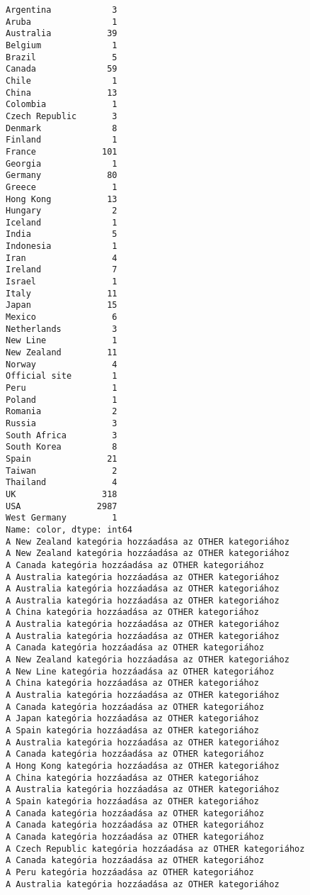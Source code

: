 \documentclass[11pt]{article}
\begin{document}
\begin{Verbatim}[commandchars=\\\{\}]
Argentina            3
Aruba                1
Australia           39
Belgium              1
Brazil               5
Canada              59
Chile                1
China               13
Colombia             1
Czech Republic       3
Denmark              8
Finland              1
France             101
Georgia              1
Germany             80
Greece               1
Hong Kong           13
Hungary              2
Iceland              1
India                5
Indonesia            1
Iran                 4
Ireland              7
Israel               1
Italy               11
Japan               15
Mexico               6
Netherlands          3
New Line             1
New Zealand         11
Norway               4
Official site        1
Peru                 1
Poland               1
Romania              2
Russia               3
South Africa         3
South Korea          8
Spain               21
Taiwan               2
Thailand             4
UK                 318
USA               2987
West Germany         1
Name: color, dtype: int64
A New Zealand kategória hozzáadása az OTHER kategoriához
A New Zealand kategória hozzáadása az OTHER kategoriához
A Canada kategória hozzáadása az OTHER kategoriához
A Australia kategória hozzáadása az OTHER kategoriához
A Australia kategória hozzáadása az OTHER kategoriához
A Australia kategória hozzáadása az OTHER kategoriához
A China kategória hozzáadása az OTHER kategoriához
A Australia kategória hozzáadása az OTHER kategoriához
A Australia kategória hozzáadása az OTHER kategoriához
A Canada kategória hozzáadása az OTHER kategoriához
A New Zealand kategória hozzáadása az OTHER kategoriához
A New Line kategória hozzáadása az OTHER kategoriához
A China kategória hozzáadása az OTHER kategoriához
A Australia kategória hozzáadása az OTHER kategoriához
A Canada kategória hozzáadása az OTHER kategoriához
A Japan kategória hozzáadása az OTHER kategoriához
A Spain kategória hozzáadása az OTHER kategoriához
A Australia kategória hozzáadása az OTHER kategoriához
A Canada kategória hozzáadása az OTHER kategoriához
A Hong Kong kategória hozzáadása az OTHER kategoriához
A China kategória hozzáadása az OTHER kategoriához
A Australia kategória hozzáadása az OTHER kategoriához
A Spain kategória hozzáadása az OTHER kategoriához
A Canada kategória hozzáadása az OTHER kategoriához
A Canada kategória hozzáadása az OTHER kategoriához
A Canada kategória hozzáadása az OTHER kategoriához
A Czech Republic kategória hozzáadása az OTHER kategoriához
A Canada kategória hozzáadása az OTHER kategoriához
A Peru kategória hozzáadása az OTHER kategoriához
A Australia kategória hozzáadása az OTHER kategoriához

\end{Verbatim}
\end{document}
